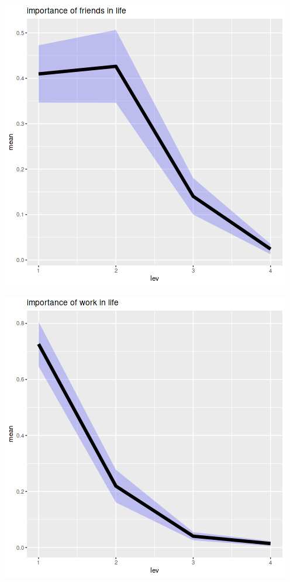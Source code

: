 \documentclass{amsart}
\begin{document}
\includegraphics[scale=0.6]{life_imp_friends.png}

\includegraphics[scale=0.6]{life_imp_work.png}
\end{document}
